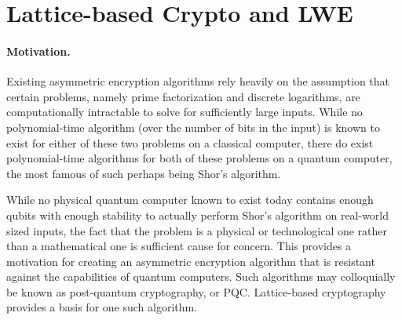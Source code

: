 \section{Lattice-based Crypto and LWE}
\label{sec:lattices}

\paragraph{Motivation.}
Existing asymmetric encryption algorithms rely heavily on the assumption that 
certain problems, namely prime factorization and discrete logarithms, are 
computationally intractable to solve for sufficiently large inputs. While no 
polynomial-time algorithm (over the number of bits in the input) is known to 
exist for either of these two problems on a classical computer, there do exist 
polynomial-time algorithms for both of these problems on a quantum computer, the 
most famous of such perhaps being Shor's algorithm.

While no physical quantum computer known to exist today contains enough qubits 
with enough stability to actually perform Shor's algorithm on real-world sized 
inputs, the fact that the problem is a physical or technological one rather than 
a mathematical one is sufficient cause for concern. This provides a motivation 
for creating an asymmetric encryption algorithm that is resistant against the 
capabilities of quantum computers. Such algorithms may colloquially be known as 
post-quantum cryptography, or PQC. Lattice-based cryptography provides a basis 
for one such algorithm.

